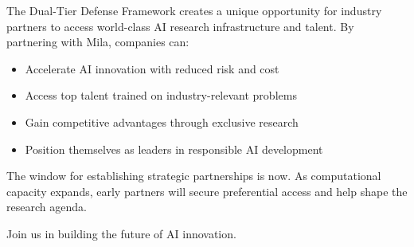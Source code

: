 The Dual-Tier Defense Framework creates a unique opportunity for industry partners to access world-class AI research infrastructure and talent. By partnering with Mila, companies can:

\begin{itemize}
\item Accelerate AI innovation with reduced risk and cost
\item Access top talent trained on industry-relevant problems
\item Gain competitive advantages through exclusive research
\item Position themselves as leaders in responsible AI development
\end{itemize}

The window for establishing strategic partnerships is now. As computational capacity expands, early partners will secure preferential access and help shape the research agenda.

Join us in building the future of AI innovation.
